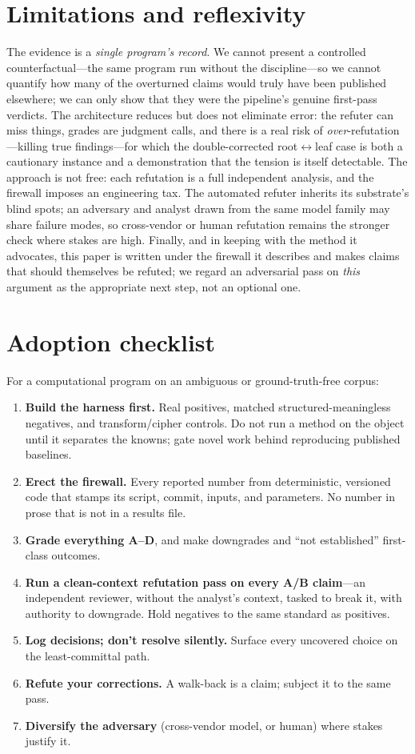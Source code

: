 \documentclass[11pt]{article}
\begin{document}
\section{Limitations and reflexivity}
The evidence is a \emph{single program's record}. We cannot present a controlled
counterfactual---the same program run without the discipline---so we cannot quantify how many
of the overturned claims would truly have been published elsewhere; we can only show that they
were the pipeline's genuine first-pass verdicts. The architecture reduces but does not
eliminate error: the refuter can miss things, grades are judgment calls, and there is a real
risk of \emph{over}-refutation---killing true findings---for which the double-corrected
root$\leftrightarrow$leaf case is both a cautionary instance and a demonstration that the
tension is itself detectable. The approach is not free: each refutation is a full independent
analysis, and the firewall imposes an engineering tax. The automated refuter inherits its
substrate's blind spots; an adversary and analyst drawn from the same model family may share
failure modes, so cross-vendor or human refutation remains the stronger check where stakes are
high. Finally, and in keeping with the method it advocates, this paper is written under the
firewall it describes and makes claims that should themselves be refuted; we regard an
adversarial pass on \emph{this} argument as the appropriate next step, not an optional one.

\section{Adoption checklist}
For a computational program on an ambiguous or ground-truth-free corpus:
\begin{enumerate}[leftmargin=1.4em,itemsep=1pt]
\item \textbf{Build the harness first.} Real positives, matched structured-meaningless
  negatives, and transform/cipher controls. Do not run a method on the object until it
  separates the knowns; gate novel work behind reproducing published baselines.
\item \textbf{Erect the firewall.} Every reported number from deterministic, versioned code
  that stamps its script, commit, inputs, and parameters. No number in prose that is not in a
  results file.
\item \textbf{Grade everything A--D}, and make downgrades and ``not established'' first-class
  outcomes.
\item \textbf{Run a clean-context refutation pass on every A/B claim}---an independent
  reviewer, without the analyst's context, tasked to break it, with authority to downgrade.
  Hold negatives to the same standard as positives.
\item \textbf{Log decisions; don't resolve silently.} Surface every uncovered choice on the
  least-committal path.
\item \textbf{Refute your corrections.} A walk-back is a claim; subject it to the same pass.
\item \textbf{Diversify the adversary} (cross-vendor model, or human) where stakes justify it.
\end{enumerate}
\end{document}
